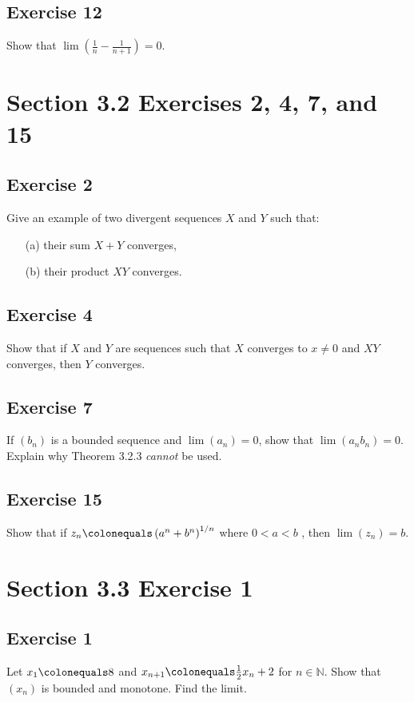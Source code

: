 \documentclass[12pt]{article}
\begin{document}
\subsection*{Exercise 12}
Show that $\displaystyle\lim\left(\frac{1}{n} - \frac{1}{n + 1}\right) = 0$.

\section*{Section 3.2 Exercises 2, 4, 7, and 15}

\subsection*{Exercise 2}
Give an example of two divergent sequences $X$ and $Y$ such that:
\begin{itemize}
\item[(a)]
their sum $X + Y$ converges,
\item[(b)]
their product $XY$ converges.
\end{itemize}

\subsection*{Exercise 4}
Show that if $X$ and $Y$ are sequences such that $X$ converges to $x \neq 0$ and $XY$ converges, then $Y$ converges.

\subsection*{Exercise 7}
If $\left(b_n\right)$ is a bounded sequence and $\lim\left(a_n\right) = 0$, show that $\lim\left(a_n b_n\right) = 0$. Explain why Theorem 3.2.3 \textit{cannot} be used.

\subsection*{Exercise 15}
Show that if $z_n \colonequals \left(a^n + b^n\right)^{1/n}$ where $0 < a < b$ , then $\lim\left(z_n\right) = b$.

\section*{Section 3.3 Exercise 1}

\subsection*{Exercise 1}
Let $x_1 \colonequals 8$ and $x_{n + 1} \colonequals \frac{1}{2} x_n + 2$ for $n \in \mathbb{N}$. Show that $\left(x_n\right)$ is bounded and monotone. Find the limit.
\end{document}
